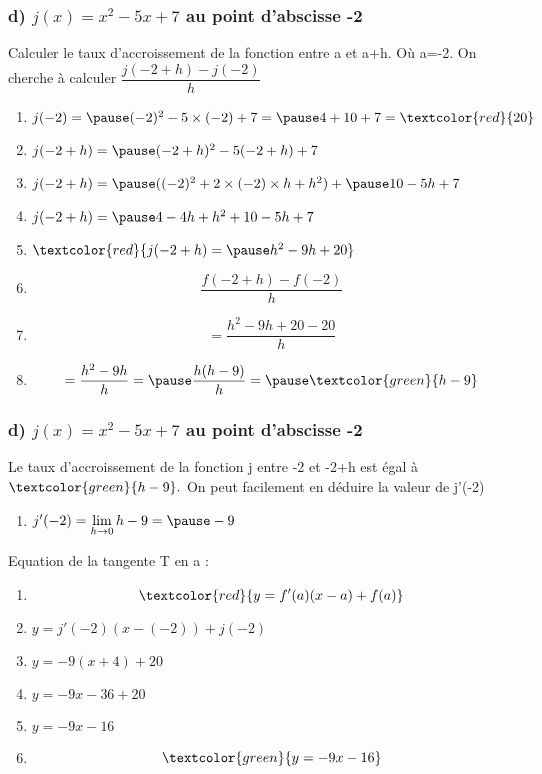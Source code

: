 \documentclass[t]{beamer}
\begin{document}
	\begin{frame}
		\frametitle{d) $j(x) = x^2 - 5x +7$ au point d'abscisse -2}
		\pause
		Calculer le taux d'accroissement de la fonction entre a et a+h. \pause Où a=-2.
		\pause
		On cherche à calculer \( \dfrac{j(-2+h) - j(-2)}{h} \)
		\pause
		\begin{enumerate}[]
			\item \(j(-2)= \pause (-2)^2 - 5\times (-2) + 7 = \pause 4 + 10 + 7 = \textcolor{red}{20} \)
			\pause
			\item \(j(-2+h)= \pause(-2+h)^2 - 5(-2+h) + 7 \)
			\pause
			\item \(j(-2+h)= \pause ((-2)^2+ 2 \times (-2) \times h + h^2) + \pause 10 - 5h + 7 \)
			\pause
			\item \(j(-2+h)= \pause 4 - 4h + h^2 + 10 - 5h + 7 \)
			\pause
			\item \(\textcolor{red}{j(-2+h)= \pause h^2 -9h + 20} \)
			\pause
			\item \[\dfrac{f(-2+h)-f(-2)}{h}\]
			\pause
			\item \[=\dfrac{h^2-9h+20-20}{h}\]
			\pause
			\item \[=\dfrac{h^2-9h}{h} = \pause \dfrac{h(h-9)}{h} = \pause \textcolor{green}{h-9} \]
			\pause
		\end{enumerate}
	\end{frame}

	\begin{frame}
		\frametitle{d) $j(x) = x^2 - 5x +7$ au point d'abscisse -2}
		\pause
		Le taux d'accroissement de la fonction j entre -2 et -2+h est égal à \pause $\textcolor{green}{h-9}.$ \pause On peut facilement en déduire la valeur de j'(-2)
		\pause
		\begin{enumerate}[]
			\item<+-> \(j'(-2) = \lim\limits_{h \rightarrow 0}h-9 = \pause -9 \)
		\end{enumerate}
		\pause
		Equation de la tangente T en a :
		\pause
		\begin{enumerate}[]
			\item<+-> \[\textcolor{red}{y = f'(a)(x-a) + f(a)}\]
			\item<+-> \(y=j'(-2)(x-(-2)) + j(-2) \)
			\item<+-> \(y= -9(x+4) + 20\)
			\item<+-> \(y= -9x-36+20\)
			\item<+-> \(y= -9x-16 \)
			\pause
			\item<+-> \[\textcolor{green}{y = -9x-16 }\]
		\end{enumerate}
	\end{frame}
\end{document}
